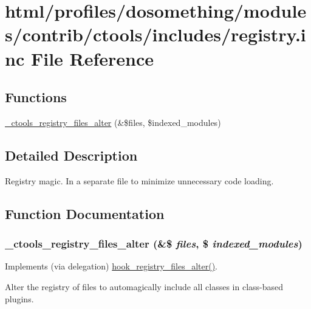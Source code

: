 \hypertarget{profiles_2dosomething_2modules_2contrib_2ctools_2includes_2registry_8inc}{
\section{html/profiles/dosomething/modules/contrib/ctools/includes/registry.inc File Reference}
\label{profiles_2dosomething_2modules_2contrib_2ctools_2includes_2registry_8inc}
}
\subsection*{Functions}
\begin{DoxyCompactItemize}
\item 
\hyperlink{profiles_2dosomething_2modules_2contrib_2ctools_2includes_2registry_8inc_ad891df9720627ddeaa3d95698e764854}{\_\-ctools\_\-registry\_\-files\_\-alter} (\&\$files, \$indexed\_\-modules)
\end{DoxyCompactItemize}


\subsection{Detailed Description}
Registry magic. In a separate file to minimize unnecessary code loading. 

\subsection{Function Documentation}
\hypertarget{profiles_2dosomething_2modules_2contrib_2ctools_2includes_2registry_8inc_ad891df9720627ddeaa3d95698e764854}{
\subsubsection[{\_\-ctools\_\-registry\_\-files\_\-alter}]{\setlength{\rightskip}{0pt plus 5cm}\_\-ctools\_\-registry\_\-files\_\-alter (\&\$ {\em files}, \/  \$ {\em indexed\_\-modules})}}
\label{profiles_2dosomething_2modules_2contrib_2ctools_2includes_2registry_8inc_ad891df9720627ddeaa3d95698e764854}
Implements (via delegation) \hyperlink{group__hooks_ga5b1201bb1afca26333900cd9aca6a2de}{hook\_\-registry\_\-files\_\-alter()}.

Alter the registry of files to automagically include all classes in class-\/based plugins. 